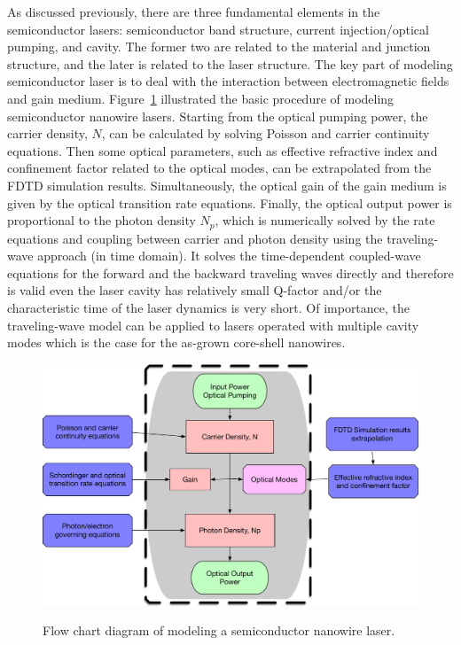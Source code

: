 As discussed previously, there are three fundamental elements in the
semiconductor lasers: semiconductor band structure, current injection/optical
pumping, and cavity. The former two are related to the material and junction
structure, and the later is related to the laser structure. The key part of
modeling semiconductor laser is to deal with the interaction between
electromagnetic fields and gain medium. Figure~\ref{NWLaserModeling}
illustrated the basic procedure of modeling semiconductor nanowire lasers.
Starting from the optical pumping power, the carrier density, $N$, can be
calculated by solving Poisson and carrier continuity equations. Then some
optical parameters, such as effective refractive index and confinement factor
related to the optical modes, can be extrapolated from the FDTD simulation
results. Simultaneously, the optical gain of the gain medium is given by the
optical transition rate equations. Finally, the optical output power is
proportional to the photon density $N_p$, which is numerically solved by the
rate equations and coupling between carrier and photon density using the
traveling-wave approach (in time domain).  It solves the time-dependent
coupled-wave equations for the forward and the backward traveling waves
directly and therefore is valid even the laser cavity has relatively small
Q-factor and/or the characteristic time of the laser dynamics is very short.
Of importance, the traveling-wave model can be applied to lasers operated with
multiple cavity modes which is the case for the as-grown core-shell nanowires.

\begin{figure}
  \caption{Flow chart diagram of modeling a semiconductor nanowire laser.}
  \centering
  \includegraphics[width=\textwidth]{pictures/LT/NWLaserModeling}
  \label{NWLaserModeling}
\end{figure}

